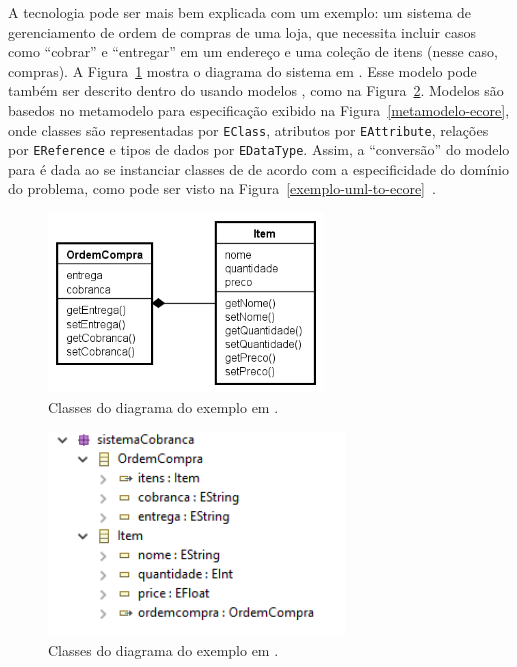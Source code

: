 A tecnologia \emf pode ser mais bem explicada com um exemplo: um sistema de gerenciamento de ordem de compras de uma loja, que necessita incluir casos como ``cobrar'' e ``entregar'' em um endereço e uma coleção de itens (nesse caso, compras). A Figura~\ref{exemplo-uml} mostra o diagrama do sistema em \uml. Esse modelo pode também ser descrito dentro do \emf usando modelos \ecore, como na Figura~\ref{exemplo-ecore}. Modelos \ecore são basedos no metamodelo para especificação exibido na Figura~\ref{metamodelo-ecore}, onde classes são representadas por \texttt{EClass}, atributos por \texttt{EAttribute}, relações por \texttt{EReference} e tipos de dados por \texttt{EDataType}. Assim, a ``conversão'' do modelo \uml para \ecore é dada ao se instanciar classes de \ecore de acordo com a especificidade do domínio do problema, como pode ser visto na Figura~\ref{exemplo-uml-to-ecore}~\cite{steinberg2008emf}. 


\begin{figure}
	\centering
	\includegraphics[width=0.65\textwidth]{figuras/exemplos-emf/exemplo-uml.png}
	\caption{Classes do diagrama do exemplo em \uml.}
	\label{exemplo-uml}
\end{figure}

\begin{figure}
	\centering
	\includegraphics[width=0.7\textwidth]{figuras/exemplos-emf/exemplo-ecore.PNG}
	\caption{Classes do diagrama do exemplo em \ecore.}
	\label{exemplo-ecore}
\end{figure}

